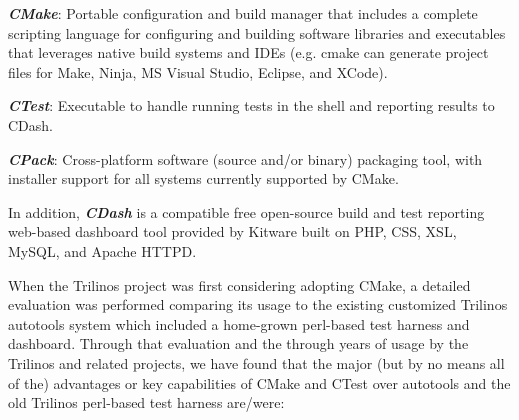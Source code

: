 \documentclass[note]{TechNote}
\begin{document}
\begin{compactitem}
\item\textit{\textbf{CMake}}: Portable configuration and build manager that includes a complete scripting language for configuring and building software libraries and executables that leverages native build systems and IDEs (e.g. cmake can generate project files for Make, Ninja, MS Visual Studio, Eclipse, and XCode).
\item\textit{\textbf{CTest}}: Executable to handle running tests in the shell and reporting results to CDash.
\item\textit{\textbf{CPack}}: Cross-platform software (source and/or binary) packaging tool, with installer support for all systems currently supported by CMake.
\end{compactitem}

In addition, \textit{\textbf{CDash}} is a compatible free open-source build and test reporting web-based dashboard tool provided by Kitware built on PHP, CSS, XSL, MySQL, and Apache HTTPD.

When the Trilinos project was first considering adopting CMake, a detailed evaluation was performed \cite{TrilinosCMakeEvaluation08} comparing its usage to the existing customized Trilinos autotools system which included a home-grown perl-based test harness and dashboard.  Through that evaluation and the through years of usage by the Trilinos and related projects, we have found that the major (but by no means all of the) advantages or key capabilities of CMake and CTest over autotools and the old Trilinos perl-based test harness are/were:
\end{document}
